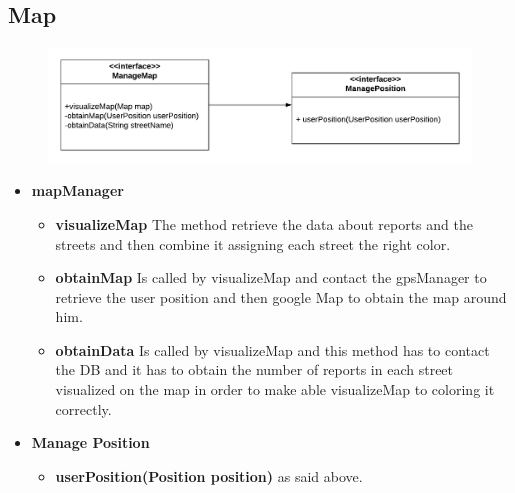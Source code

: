 \documentclass[12pt,a4paper]{report}
\begin{document}
			\subsection{Map}
				\begin{figure}[H]
						\includegraphics[width = \textwidth, center]{mapInterface}
						\label{fig: interfaces}
				\end{figure}
				\begin{itemize}
						\item \textbf{mapManager}
						\begin{itemize}
							\item \textbf{visualizeMap} The method retrieve the data about reports and the streets
								and then combine it assigning each street the right color. 
							\item \textbf{obtainMap} Is called by visualizeMap and contact the gpsManager to
								retrieve the user position and then google Map to obtain the map around him.
							\item \textbf{obtainData} Is called by visualizeMap and this method has to contact the DB
								and it has to obtain the number of reports in each street visualized on the map in
								order to make able visualizeMap to coloring it correctly.
						\end{itemize}
					\item \textbf{Manage Position}
					\begin{itemize}
						\item \textbf{userPosition(Position position)} as said above.
					\end{itemize}
				\end{itemize}
\end{document}
